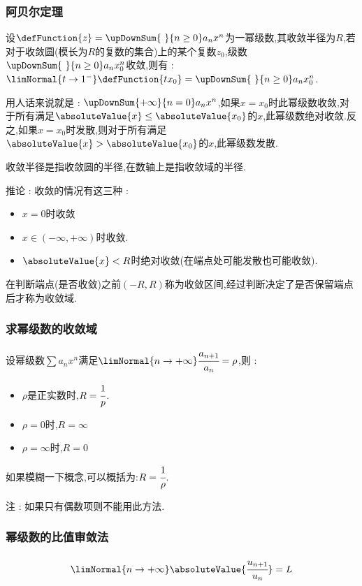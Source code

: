 {{{\subsubsection{阿贝尔定理}{
  设$\defFunction{z} = \upDownSum{\ }{n \geq 0}a_nx^n$为一幂级数,其收敛半径为$R$,若对于收敛圆(模长为$R$的复数的集合)上的某个复数$z_0$,级数$\upDownSum{\ }{n \geq 0}a_nx^n_0$收敛,则有 : $\limNormal{t \to 1^-}\defFunction{tx_0} = \upDownSum{\ }{n \geq 0}a_nx^n_0$.

  用人话来说就是 : $\upDownSum{+\infty}{n = 0}a_nx^n$,如果$x = x_0$时此幂级数收敛,对于所有满足$\absoluteValue{x} \leq \absoluteValue{x_0}$的$x$,此幂级数绝对收敛.反之,如果$x = x_0$时发散,则对于所有满足$\absoluteValue{x} > \absoluteValue{x_0}$的$x$,此幂级数发散.

  收敛半径是指收敛圆的半径,在数轴上是指收敛域的半径.

  推论 : 收敛的情况有这三种 :
  \begin{itemize}
    \item $x = 0$时收敛
    \item $x \in (-\infty,+\infty)$时收敛.
    \item $\absoluteValue{x} < R$时绝对收敛(在端点处可能发散也可能收敛).
  \end{itemize}
  在判断端点(是否收敛)之前$(-R,R)$称为收敛区间,经过判断决定了是否保留端点后才称为收敛域.
}

\subsubsection{求幂级数的收敛域}{
  设幂级数$\sum a_nx^n$满足$\limNormal{n \to +\infty}\cfrac{a_{n + 1}}{a_n} = \rho$,则 :
  \begin{itemize}
    \item $\rho$是正实数时,$R = \cfrac{1}{p}$.
    \item $\rho = 0$时,$R = \infty$
    \item $\rho = \infty$时,$R = 0$
  \end{itemize}

  如果模糊一下概念,可以概括为:$R = \cfrac{1}{\rho}$.

  注 : 如果只有偶数项则不能用此方法.
}%

\subsubsection{幂级数的比值审敛法}{
$$
  \limNormal{n \to +\infty}\absoluteValue{\cfrac{u_{n + 1}}{u_n}} = L
$$

}}}}
